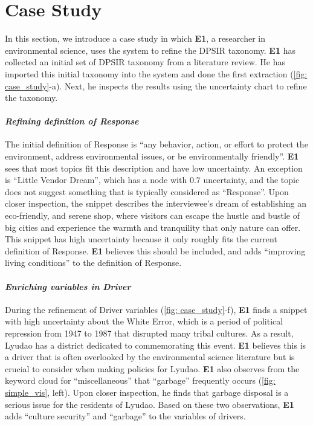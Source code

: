 

\vspace*{-0.15cm}
\section{Case Study}
In this section, we introduce a case study in which \textbf{E1}, a researcher in environmental science, uses the system to refine the DPSIR taxonomy. \textbf{E1} has collected an initial set of DPSIR taxonomy from a literature review. He has imported this initial taxonomy into the system and done the first extraction (\autoref{fig: case_study}-a). Next, he inspects the results using the uncertainty chart to refine the taxonomy. 

\vspace*{-0.12cm}
\paragraph{\textbf{\textit{Refining definition of \textit{Response}}}} The initial definition of Response is ``any behavior, action, or effort to protect the environment, address environmental issues, or be environmentally friendly''. 
\textbf{E1} sees that most topics fit this description and have low uncertainty. An exception is ``Little Vendor Dream'', which has a node with $0.7$ uncertainty, and the topic does not suggest something that is typically considered as ``Response''. Upon closer inspection, the snippet describes the interviewee's dream of establishing an eco-friendly, and serene shop, where visitors can escape the hustle and bustle of big cities and experience the warmth and tranquility that only nature can offer. This snippet has high uncertainty because it only roughly fits the current definition of Response. \textbf{E1} believes this should be included, and adds ``improving living conditions'' to the definition of Response.

\vspace*{-0.12cm}
\paragraph{\textbf{\textit{Enriching variables in \textit{Driver}}}}
During the refinement of Driver variables (\autoref{fig: case_study}-f), \textbf{E1} finds a snippet with high uncertainty about the White Error, which is a period of political repression from 1947 to 1987 that disrupted many tribal cultures. As a result, Lyudao has a district dedicated to commemorating this event. 
\textbf{E1} believes this is a driver that is often overlooked by the environmental science literature but is crucial to consider when making policies for Lyudao. 
\textbf{E1} also observes from the keyword cloud for ``miscellaneous'' that ``garbage'' frequently occurs (\autoref{fig: simple_vis}, left). Upon closer inspection, he finds that garbage disposal is a serious issue for the residents of Lyudao.
Based on these two observations, \textbf{E1} adds ``culture security'' and ``garbage'' to the variables of drivers. 

